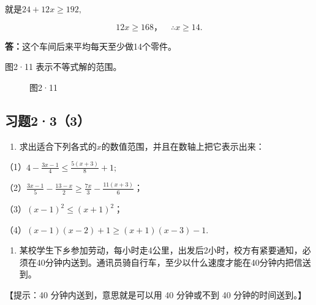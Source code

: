 就是\(24 + 12x \geqslant 192,\)

\[
12 x \geqslant 168\text{，} \quad \therefore x \geqslant 14.
\]

\textbf{答：}这个车间后来平均每天至少做14个零件。

图2·11 表示不等式解的范围。

\begin{figure}
\centering
{}
\caption{图2·11}
\end{figure}

\subsection{习题2·3（3）}

\begin{enumerate}
\item
  求出适合下列各式的\(x\)的数值范围，并且在数轴上把它表示出来：
\end{enumerate}

（1）\(4 - \frac{3x - 1}{4} \leqslant \frac{5(x + 3)}{8} + 1;\)

（2）\(\frac{3x - 1}{5} - \frac{13 - x}{2} \geqslant \frac{7x}{3} - \frac{11(x + 3)}{6}\)；

（3）\((x - 1)^{2} \leqslant (x + 1)^{2}\)；

（4）\((x - 1)(x - 2) + 1 \geqslant (x + 1)(x - 3) - 1.\)

\begin{enumerate}[start=2]
\item
  某校学生下乡参加劳动，每小时走4公里，出发后2小时，校方有紧要通知，必须在40分钟内送到。通讯员骑自行车，至少以什么速度才能在40分钟内把信送到。
\end{enumerate}

【提示：40 分钟内送到，意思就是可以用 40 分钟或不到 40
分钟的时间送到。】

